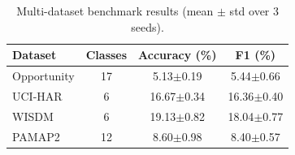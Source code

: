 \begin{table}[htbp]
\centering
\caption{Multi-dataset benchmark results (mean $\pm$ std over 3 seeds).}
\label{tab:multi_dataset_results}
\begin{tabular}{lccc}
\toprule
\textbf{Dataset} & \textbf{Classes} & \textbf{Accuracy (\%)} & \textbf{F1 (\%)} \\
\midrule
Opportunity & 17 & 5.13$\pm$0.19 & 5.44$\pm$0.66 \\
UCI-HAR & 6 & 16.67$\pm$0.34 & 16.36$\pm$0.40 \\
WISDM & 6 & 19.13$\pm$0.82 & 18.04$\pm$0.77 \\
PAMAP2 & 12 & 8.60$\pm$0.98 & 8.40$\pm$0.57 \\
\bottomrule
\end{tabular}
\end{table}
